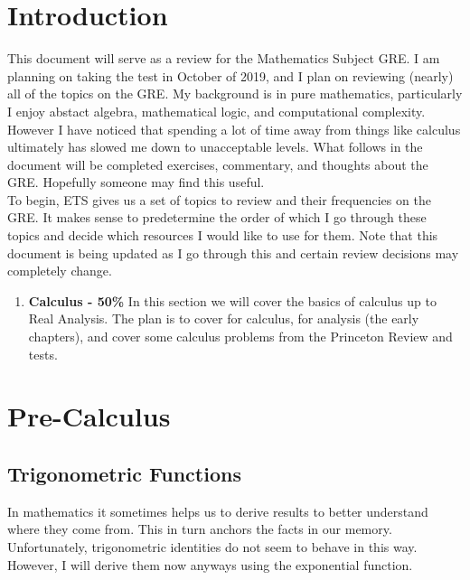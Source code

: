 
\def\name{Daniel Tobias}
\def\assignment{Mathematics GRE Review}
\usepackage{hyperref}

\section{Introduction}
This document will serve as a review for the Mathematics Subject GRE. I am planning on taking the test in October of 2019, and I plan on reviewing (nearly) all of the topics on the GRE. My background is in pure mathematics, particularly I enjoy abstact algebra, mathematical logic, and computational complexity. However I have noticed that spending a lot of time away from things like calculus ultimately has slowed me down to unacceptable levels. What follows in the document will be completed exercises, commentary, and thoughts about the GRE. Hopefully someone may find this useful.\\

To begin, ETS gives us a set of topics to review and their frequencies on the GRE. It makes sense to predetermine the order of which I go through these topics and decide which resources I would like to use for them. Note that this document is being updated as I go through this and certain review decisions may completely change.

\begin{enumerate}
	\item \textbf{Calculus - 50\%} In this section we will cover the basics of calculus up to Real Analysis. The plan is to cover \cite{Stewart} for calculus, \cite{Rudin} for analysis (the early chapters), and cover some calculus problems from the Princeton Review and \cite{UC} tests.
\end{enumerate}

\section{Pre-Calculus}
\subsection{Trigonometric Functions}
In mathematics it sometimes helps us to derive results to better understand where they come from. This in turn anchors the facts in our memory. Unfortunately, trigonometric identities do not seem to behave in this way. However, I will derive them now anyways using the exponential function.
